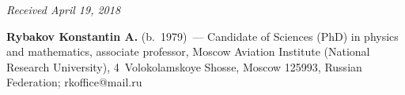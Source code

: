 \vspace*{-6pt}

\hfill{\small\textit{Received April 19, 2018}}





\Contrl

\noindent
\textbf{Rybakov Konstantin A.} (b.\ 1979)~---
Candidate of Sciences (PhD) in physics and mathematics, 
associate professor, Moscow Aviation Institute (National Research University), 
4~Volokolamskoye Shosse, Moscow 125993, Russian Federation; \mbox{rkoffice@mail.ru}


\label{end\stat}

\renewcommand{\bibname}{\protect\rm Литература}       